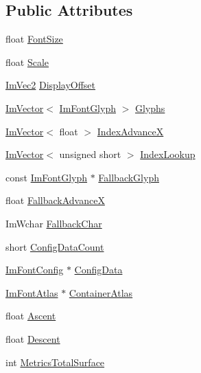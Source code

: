 \subsection*{Public Attributes}
\begin{DoxyCompactItemize}
\item 
float \hyperlink{struct_im_font_a423e36d1594281f1a5a537e5b0d0a3d4}{Font\+Size}
\item 
float \hyperlink{struct_im_font_ae98fb07fd8862a7243d77b11f38bba19}{Scale}
\item 
\hyperlink{struct_im_vec2}{Im\+Vec2} \hyperlink{struct_im_font_af9b95f3df0b6d45f45903d82301d7f84}{Display\+Offset}
\item 
\hyperlink{class_im_vector}{Im\+Vector}$<$ \hyperlink{struct_im_font_glyph}{Im\+Font\+Glyph} $>$ \hyperlink{struct_im_font_a1a0901fc1a8cbd41d582d6cef4946bc9}{Glyphs}
\item 
\hyperlink{class_im_vector}{Im\+Vector}$<$ float $>$ \hyperlink{struct_im_font_af906476eda06d8a842d0a843a247f530}{Index\+AdvanceX}
\item 
\hyperlink{class_im_vector}{Im\+Vector}$<$ unsigned short $>$ \hyperlink{struct_im_font_aaab48cbf05ca962d71ab3e7b597b992f}{Index\+Lookup}
\item 
const \hyperlink{struct_im_font_glyph}{Im\+Font\+Glyph} $\ast$ \hyperlink{struct_im_font_a0e666b0c49646bd294103f4d288df4b8}{Fallback\+Glyph}
\item 
float \hyperlink{struct_im_font_ad58a5ee4492a3a9fa56f73e5a40d728d}{Fallback\+AdvanceX}
\item 
Im\+Wchar \hyperlink{struct_im_font_ae54c2c4184bfcbc7b8f6da9cbc4f93c0}{Fallback\+Char}
\item 
short \hyperlink{struct_im_font_a4a30fc7711d628ad582ccb3188a51ddd}{Config\+Data\+Count}
\item 
\hyperlink{struct_im_font_config}{Im\+Font\+Config} $\ast$ \hyperlink{struct_im_font_afa4eb6cfb979ffa120e9795f328623a1}{Config\+Data}
\item 
\hyperlink{struct_im_font_atlas}{Im\+Font\+Atlas} $\ast$ \hyperlink{struct_im_font_a8a5e0df6be5e3cabe91ae830524db960}{Container\+Atlas}
\item 
float \hyperlink{struct_im_font_a5238ef18f8ad02b783fb8b3a195b708e}{Ascent}
\item 
float \hyperlink{struct_im_font_abcca12aa908bf7105433e7db6088a5e5}{Descent}
\item 
int \hyperlink{struct_im_font_a8087b2ee8b27dcf5c6e30a8318f87cc7}{Metrics\+Total\+Surface}
\end{DoxyCompactItemize}


